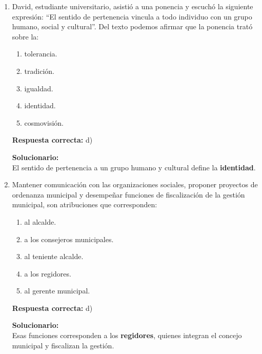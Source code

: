 \begin{enumerate}

	
	\item David, estudiante universitario, asistió a una ponencia y escuchó la siguiente expresión: ``El sentido de pertenencia vincula a todo individuo con un grupo humano, social y cultural''. Del texto podemos afirmar que la ponencia trató sobre la:
	\begin{enumerate}[label=\alph*)]
		\item tolerancia.
		\item tradición.
		\item igualdad.
		\item identidad.
		\item cosmovisión.
	\end{enumerate}
	\textbf{Respuesta correcta:} d)
	
	\vspace{2mm}
	\textbf{Solucionario:}\\
	El sentido de pertenencia a un grupo humano y cultural define la \textbf{identidad}.
	

	
	\vspace{6mm}
	
	\item Mantener comunicación con las organizaciones sociales, proponer proyectos de ordenanza municipal y desempeñar funciones de fiscalización de la gestión municipal, son atribuciones que corresponden:
	\begin{enumerate}[label=\alph*)]
		\item al alcalde.
		\item a los consejeros municipales.
		\item al teniente alcalde.
		\item a los regidores.
		\item al gerente municipal.
	\end{enumerate}
	\textbf{Respuesta correcta:} d)
	
	\vspace{2mm}
	\textbf{Solucionario:}\\
	Esas funciones corresponden a los \textbf{regidores}, quienes integran el concejo municipal y fiscalizan la gestión.
	

	
	\vspace{6mm}
	

\end{enumerate}
